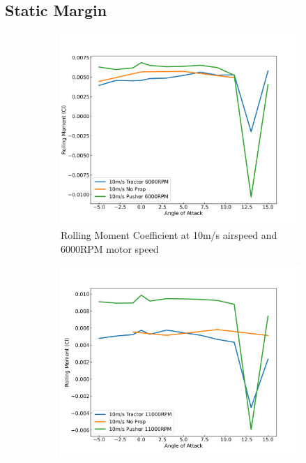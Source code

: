 \subsection{Static Margin}

\begin{figure}[H]
    \centering
    \begin{subfigure}[b]{0.467\textwidth}
        \centering
        \includegraphics[width=\textwidth]{05_Results/Figs/Cl_roll/10ms_6000RPM_Cl_roll.png}
        \caption{Rolling Moment Coefficient at 10m/s airspeed and 6000RPM motor speed}
        \label{fig:CmCl_10ms_6000}
    \end{subfigure}
    \begin{subfigure}[b]{0.467\textwidth}
        \centering
        \includegraphics[width=\textwidth]{05_Results/Figs/Cl_roll/10ms_11000RPM_Cl.png}

\end{subfigure}
\end{figure}
